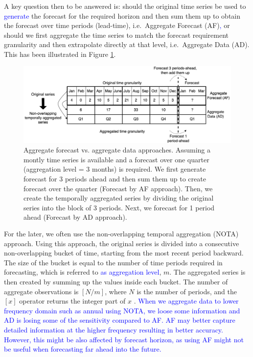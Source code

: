 \documentclass[preprint, 3p,
authoryear]{elsarticle} %
\begin{document}
A key question then to be answered is: should the original time series
be used to \textcolor{blue}{generate} the forecast for the required
horizon and then sum them up to obtain the forecast over time periods
(lead-time), i.e.~Aggregate Forecast (AF)\textcolor{blue}{,} or should
we first aggregate the time series to match the forecast requirement
granularity and then extrapolate directly at that level, i.e.~Aggregate
Data (AD). This has been illustrated in Figure \ref{fig:example_oanoa}.

\begin{figure}[H]
\includegraphics[width=0.9\linewidth]{img/nota} \caption{Aggregate forecast vs. aggregate data approaches. Assuming a montly time series is available and a forecast over one quarter (aggregation level = 3 months) is required. We first generate forecast for 3 periods ahead and then sum them up to create forecast over the quarter (Forecast by AF approach). Then, we create the temporally aggregated series by dividing the original series into the block of 3 periods. Next, we forecast for 1 period ahead (Forecast by AD approach).}\label{fig:example_oanoa}
\end{figure}

For the later, we often use the non-overlapping temporal aggregation
(NOTA) approach. Using this approach, the original series is divided
into a consecutive non-overlapping bucket of time, starting from the
most recent period backward. The size of the bucket is equal to the
number of time periods required in forecasting, which is referred to
\textcolor{blue}{as aggregation level}, \(m\). The aggregated series is
then created by summing up the values inside each bucket. The number of
aggregate observations is \([N/m]\), where \(N\) is the number of
periods, and the \([x]\) operator returns the integer part of \(x\)
\citep{rostami2019impact}.
\textcolor{blue}{When we aggregate data to lower frequency domain such as annual using NOTA, we loose some information and AD is losing some of the sensitivity compared to AF. AF may better capture detailed information at the higher frequency resulting in better accuracy. However, this might be also affected by forecast horizon, as using AF might not be useful when forecasting far ahead into the future.}
\end{document}
